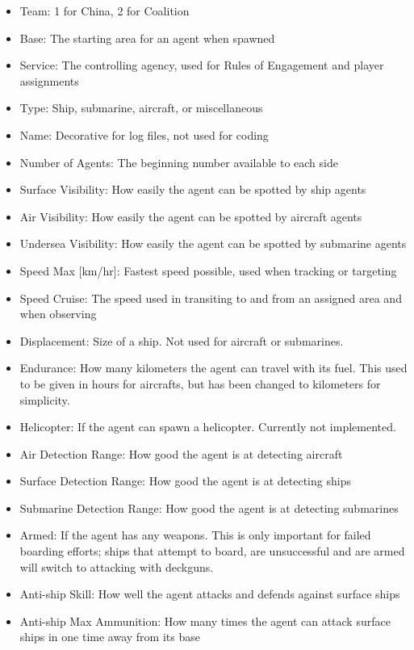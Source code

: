 \documentclass{article}
\begin{document}
\begin{itemize}
    \item Team: 1 for China, 2 for Coalition
    \item Base: The starting area for an agent when spawned
    \item Service: The controlling agency, used for Rules of Engagement and player assignments
    \item Type: Ship, submarine, aircraft, or miscellaneous
    \item Name: Decorative for log files, not used for coding
    \item Number of Agents: The beginning number available to each side
    \item Surface Visibility: How easily the agent can be spotted by ship agents
    \item Air Visibility: How easily the agent can be spotted by aircraft agents
    \item Undersea Visibility: How easily the agent can be spotted by submarine agents
    \item Speed Max [km/hr]: Fastest speed possible, used when tracking or targeting
    \item Speed Cruise: The speed used in transiting to and from an assigned area and when observing
    \item Displacement: Size of a ship. Not used for aircraft or submarines.
    \item Endurance: How many kilometers the agent can travel with its fuel. This used to be given in hours for aircrafts, but has been changed to kilometers for simplicity.
    \item Helicopter: If the agent can spawn a helicopter. Currently not implemented.
    \item Air Detection Range: How good the agent is at detecting aircraft
    \item Surface Detection Range: How good the agent is at detecting ships
    \item Submarine Detection Range: How good the agent is at detecting submarines
    \item Armed: If the agent has any weapons. This is only important for failed boarding efforts; ships that attempt to board, are unsuccessful and are armed will switch to attacking with deckguns.
    \item Anti-ship Skill: How well the agent attacks and defends against surface ships
    \item Anti-ship Max Ammunition: How many times the agent can attack surface ships in one time away from its base

\end{itemize}
\end{document}
